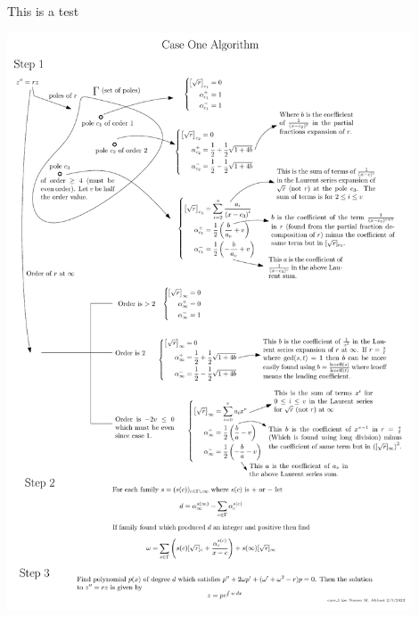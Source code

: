 \documentclass[12pt,a4paper]{article}
\begin{document}
This is a test

\noindent\includegraphics[width=0.9\textwidth]{case_1}
\end{document}
